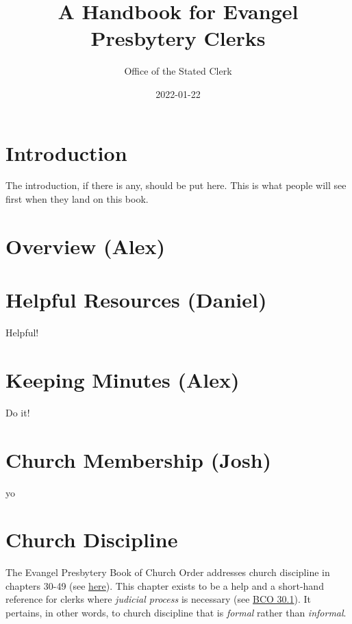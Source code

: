\documentclass[
]{book}
\title{A Handbook for Evangel Presbytery Clerks}
\author{Office of the Stated Clerk}
\date{2022-01-22}
\begin{document}
\maketitle

{
\setcounter{tocdepth}{1}
\tableofcontents
}
\hypertarget{introduction}{%
\chapter{Introduction}\label{introduction}}

The introduction, if there is any, should be put here. This is what people will see first when they land on this book.

\hypertarget{overview-alex}{%
\chapter{Overview (Alex)}\label{overview-alex}}

\hypertarget{helpful-resources-daniel}{%
\chapter{Helpful Resources (Daniel)}\label{helpful-resources-daniel}}

Helpful!

\hypertarget{keeping-minutes-alex}{%
\chapter{Keeping Minutes (Alex)}\label{keeping-minutes-alex}}

Do it!

\hypertarget{church-membership-josh}{%
\chapter{Church Membership (Josh)}\label{church-membership-josh}}

yo

\hypertarget{church-discipline}{%
\chapter{Church Discipline}\label{church-discipline}}

The Evangel Presbytery Book of Church Order addresses church discipline in chapters 30-49 (see \href{https://evangel.pressbooks.com/chapter/30-discipline-its-nature-subjects-and-ends/}{here}). This chapter exists to be a help and a short-hand reference for clerks where \emph{judicial process} is necessary (see \href{https://evangel.pressbooks.com/chapter/30-discipline-its-nature-subjects-and-ends/}{BCO 30.1}). It pertains, in other words, to church discipline that is \emph{formal} rather than \emph{informal}.
\end{document}
